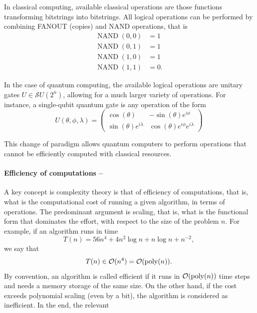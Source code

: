 \documentclass[]{report}
\begin{document}
In classical computing, available classical operations are those functions transforming bitstrings into bitstrings. All logical operations can be performed by combining FANOUT (copies) and NAND operations, that is 
\begin{align}
\operatorname{NAND}(0, 0) & = 1 \\
\operatorname{NAND}(0, 1) & = 1 \\
\operatorname{NAND}(1, 0) & = 1 \\
\operatorname{NAND}(1, 1) & = 0 .
\end{align}

In the case of quantum computing, the available logical operations are unitary gates $U \in \mathcal SU(2^n)$, allowing for a much larger variety of operations. For instance, a single-qubit quantum gate is any operation of the form
\begin{equation}
U(\theta, \phi, \lambda) = \begin{pmatrix}
\cos(\theta) & -\sin(\theta) e^{i\phi} \\
\sin(\theta) e^{i\lambda} & \cos(\theta) e^{i\phi} e^{i\lambda}
\end{pmatrix}
\end{equation}

This change of paradigm allows quantum computers to perform operations that cannot be efficiently computed with classical resources. 

\paragraph{Efficiency of computations --} A key concept is complexity theory is that of efficiency of computations, that is, what is the computational cost of running a given algorithm, in terms of operations. The predominant argument is scaling, that is, what is the functional form that dominates the effort, with respect to the size of the problem $n$. For example, if an algorithm runs in time
\begin{equation}
T(n) = 56 n^4 + 4n^2 \log n + n \log n + n^{-2}, 
\end{equation}
we say that 
\begin{equation}
T(n) \in \mathcal O(n^4) = \mathcal O({\rm poly}(n)).
\end{equation}
By convention, an algorithm is called efficient if it runs in $\mathcal O({\rm poly}(n))$ time steps and needs a memory storage of the same size. On the other hand, if the cost exceeds polynomial scaling (even by a bit), the algorithm is considered as inefficient. In the end, the relevant 
\end{document}
